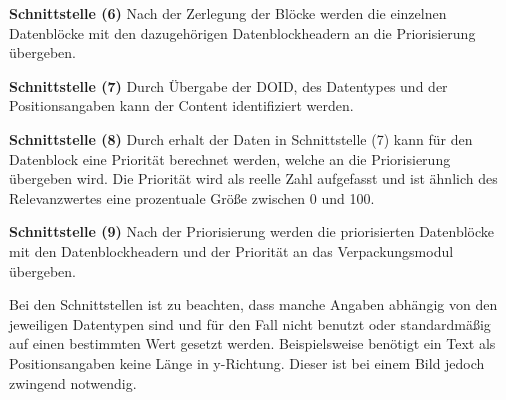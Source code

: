 \textbf{Schnittstelle (6)} \newline
Nach der Zerlegung der Blöcke werden die einzelnen
Datenblöcke mit den dazugehörigen Datenblockheadern an die
Priorisierung übergeben.

\textbf{Schnittstelle (7)} \newline
Durch Übergabe der DOID, des Datentypes und der Positionsangaben kann der
Content identifiziert werden.

\textbf{Schnittstelle (8)} \newline
Durch erhalt der Daten in Schnittstelle (7) kann für
den Datenblock eine Priorität berechnet werden, welche an die Priorisierung übergeben
wird. Die Priorität wird als reelle Zahl aufgefasst und ist ähnlich des
Relevanzwertes eine prozentuale Größe zwischen 0 und 100.

\textbf{Schnittstelle (9)} \newline
Nach der Priorisierung werden die priorisierten Datenblöcke mit den
Datenblockheadern und der Priorität an das Verpackungsmodul übergeben.

Bei den Schnittstellen ist zu beachten, dass manche Angaben abhängig von den
jeweiligen Datentypen sind und für den Fall nicht benutzt oder
standardmäßig auf einen bestimmten Wert gesetzt werden. Beispielsweise benötigt
ein Text als Positionsangaben keine Länge in y-Richtung. Dieser ist bei einem
Bild jedoch zwingend notwendig.
